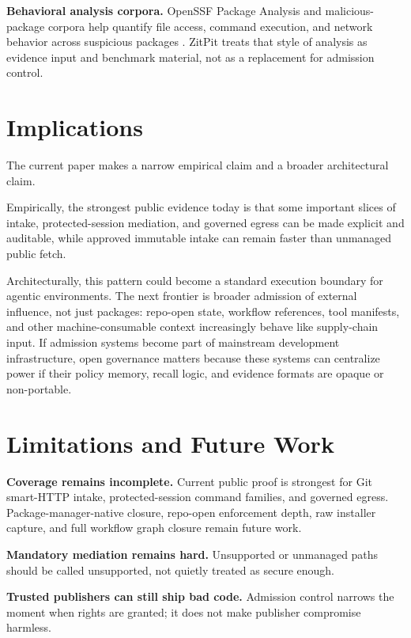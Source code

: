 \documentclass[conference]{IEEEtran}
\newcommand{\product}{ZitPit}
\begin{document}
\textbf{Behavioral analysis corpora.} OpenSSF Package Analysis and malicious-package corpora help quantify file access, command execution, and network behavior across suspicious packages \cite{openssfPackageAnalysis2026,openssfMaliciousPackages2026}. \product{} treats that style of analysis as evidence input and benchmark material, not as a replacement for admission control.

\section{Implications}

The current paper makes a narrow empirical claim and a broader architectural claim.

Empirically, the strongest public evidence today is that some important slices of intake, protected-session mediation, and governed egress can be made explicit and auditable, while approved immutable intake can remain faster than unmanaged public fetch.

Architecturally, this pattern could become a standard execution boundary for agentic environments. The next frontier is broader admission of external influence, not just packages: repo-open state, workflow references, tool manifests, and other machine-consumable context increasingly behave like supply-chain input. If admission systems become part of mainstream development infrastructure, open governance matters because these systems can centralize power if their policy memory, recall logic, and evidence formats are opaque or non-portable.

\section{Limitations and Future Work}

\textbf{Coverage remains incomplete.} Current public proof is strongest for Git smart-HTTP intake, protected-session command families, and governed egress. Package-manager-native closure, repo-open enforcement depth, raw installer capture, and full workflow graph closure remain future work.

\textbf{Mandatory mediation remains hard.} Unsupported or unmanaged paths should be called unsupported, not quietly treated as secure enough.

\textbf{Trusted publishers can still ship bad code.} Admission control narrows the moment when rights are granted; it does not make publisher compromise harmless.
\end{document}
